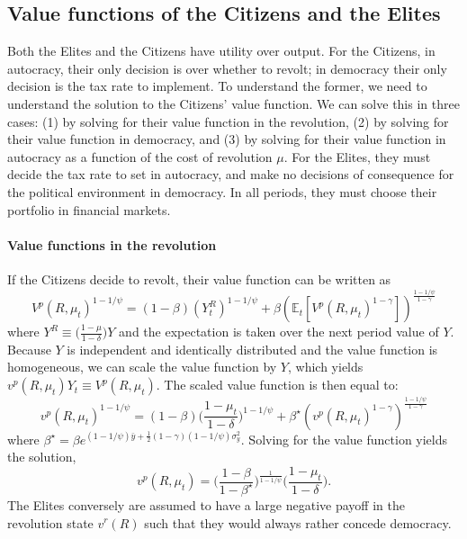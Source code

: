 \documentclass[12pt]{article}
\numberwithin{equation}{section}
\begin{document}
\subsection{Value functions of the Citizens and the Elites}\label{section:bellman_app}

Both the Elites and the Citizens have \citeauthor{Epstein1989} utility over output. For the Citizens, in autocracy, their only decision is over whether to revolt; in democracy their only decision is the tax rate to implement. To understand the former, we need to understand the solution to the Citizens' value function. We can solve this in three cases: (1) by solving for their value function in the revolution, (2) by solving for their value function in democracy, and (3) by solving for their value function in autocracy as a function of the cost of revolution $\mu$. For the Elites, they must decide the tax rate to set in autocracy, and make no decisions of consequence for the political environment in democracy. In all periods, they must choose their portfolio in financial markets.

\paragraph{Value functions in the revolution}
If the Citizens decide to revolt, their value function can be written as
\begin{equation*}
V^{p}(R,\mu_{t})^{1-1/\psi}=(1-\beta)(Y_{t}^{R})^{1-1/\psi}+\beta\left(\mathbb{E}_{t}\left[V^{p}(R,\mu_{t})^{1-\gamma}\right]\right)^{\frac{1-1/\psi}{1-\gamma}}
\end{equation*}
where $Y^R \equiv \big(\frac{1-\mu}{1-\delta}\big) Y$ and the expectation is taken over the next period value of $Y$. Because $Y$ is independent and identically distributed and the value function is homogeneous, we can scale the value function by $Y$, which yields $v^{p}(R,\mu_t)Y_t \equiv V^{p}(R,\mu_t)$. The scaled value function is then equal to:
\begin{equation*}
v^{p}(R,\mu_{t})^{1-1/\psi}=(1-\beta)\bigg(\frac{1-\mu_t}{1-\delta}\bigg)^{1-1/\psi}+\beta^{\star}\left(v^{p}(R,\mu_{t})^{1-\gamma}\right)^{\frac{1-1/\psi}{1-\gamma}}
\end{equation*}
where $\beta^{\star}=\beta e^{(1-1/\psi)\bar{y}+\frac{1}{2}(1-\gamma)(1-1/\psi)\sigma_{y}^{2}}$. Solving for the value function yields the solution,
\begin{equation*}
v^{p}(R,\mu_{t})=\bigg(\frac{1-\beta}{1-\beta^{\star}}\bigg)^{\frac{1}{1-1/\psi}}\bigg(\frac{1-\mu_t}{1-\delta}\bigg).
\end{equation*}
The Elites conversely are assumed to have a large negative payoff in the revolution state $v^r(R)$ such that they would always rather concede democracy.
\end{document}
